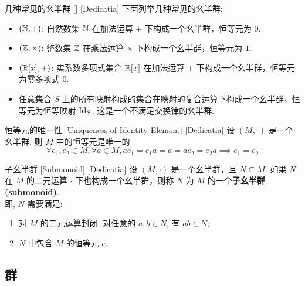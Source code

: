         \begin{xmp}
            {几种常见的幺半群}
            []
            [Dedicatia]
            下面列举几种常见的幺半群:\begin{itemize}
                \item \((\operatorname{\mathbb{N}},+)\): 自然数集 \(\operatorname{\mathbb{N}}\) 在加法运算 \(+\) 下构成一个幺半群，恒等元为 \(0\).
                \item \((\operatorname{\mathbb{Z}},\times)\): 整数集 \(\operatorname{\mathbb{Z}}\) 在乘法运算 \(\times\) 下构成一个幺半群，恒等元为 \(1\).
                \item \((\operatorname{\mathbb{R}}[x],+)\): 实系数多项式集合 \(\operatorname{\mathbb{R}}[x]\) 在加法运算 \(+\) 下构成一个幺半群，恒等元为零多项式 \(0\).
                \item 任意集合 \(S\) 上的所有映射构成的集合在映射的复合运算下构成一个幺半群，恒等元为恒等映射 \(\operatorname{Id}_S\). 这是一个不满足交换律的幺半群.
            \end{itemize}
        \end{xmp}

        \begin{ppt}
            {恒等元的唯一性}
            [Uniqueness of Identity Element]
            [Dedicatia]
            设 \((M,\cdot)\) 是一个幺半群. 则 \(M\) 中的恒等元是唯一的.
            \[\forall e_1,e_2\in M, \forall a\in M, ae_1=e_1a=a=ae_2=e_2a\implies e_1=e_2\]
        \end{ppt}

        \begin{dfn}
            [Submonoid]
            {子幺半群}
            [Submonoid]
            [Dedicatia]
            设 \((M,\cdot)\) 是一个幺半群，且 \(N\subseteq M\). 如果 \(N\) 在 \(M\) 的二元运算 \(\cdot\) 下也构成一个幺半群，则称 \(N\) 为 \(M\) 的一个\textbf{子幺半群(submonoid)}.\\
            即, \(N\) 需要满足:
            \begin{enumerate}
                \item 对 \(M\) 的二元运算封闭: 对任意的 \(a,b\in N\), 有 \(ab\in N\);
                \item \(N\) 中包含 \(M\) 的恒等元 \(e\).
            \end{enumerate}
        \end{dfn}

    \subsection{群}


